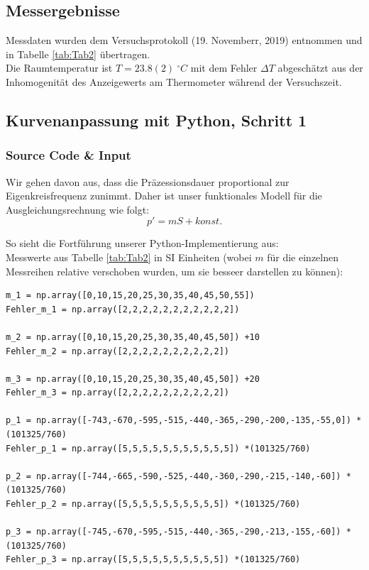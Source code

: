 \documentclass[a4paper,10pt]{article}
\begin{document}
\subsection{Messergebnisse}
Messdaten wurden dem Versuchsprotokoll (19. Novemberr, 2019) entnommen und in Tabelle \ref{tab:Tab2} übertragen.\\
Die Raumtemperatur ist \(T=23.8(2)\:^{\circ}C\) mit dem Fehler \(\Delta T\) abgeschätzt aus der Inhomogenität des Anzeigewerts am Thermometer während der Versuchszeit.
\subsection{Kurvenanpassung mit Python, Schritt 1}
\subsubsection{Source Code \& Input}
Wir gehen davon aus, dass die Präzessionsdauer proportional zur Eigenkreisfrequenz zunimmt.
Daher ist unser funktionales Modell für die Ausgleichungsrechnung wie folgt:
\begin{equation} \label{eq:Fit2}
	\boxed{p' = mS + konst.}
\end{equation} 

So sieht die Fortführung unserer Python-Implementierung aus:\\

Messwerte aus Tabelle \ref{tab:Tab2} in SI Einheiten (wobei \(m\) für die einzelnen Messreihen relative verschoben wurden, um sie besseer darstellen zu können):
\begin{lstlisting}
m_1 = np.array([0,10,15,20,25,30,35,40,45,50,55]) 
Fehler_m_1 = np.array([2,2,2,2,2,2,2,2,2,2,2])

m_2 = np.array([0,10,15,20,25,30,35,40,45,50]) +10 
Fehler_m_2 = np.array([2,2,2,2,2,2,2,2,2,2])

m_3 = np.array([0,10,15,20,25,30,35,40,45,50]) +20 
Fehler_m_3 = np.array([2,2,2,2,2,2,2,2,2,2])

p_1 = np.array([-743,-670,-595,-515,-440,-365,-290,-200,-135,-55,0]) *(101325/760)
Fehler_p_1 = np.array([5,5,5,5,5,5,5,5,5,5,5]) *(101325/760)

p_2 = np.array([-744,-665,-590,-525,-440,-360,-290,-215,-140,-60]) *(101325/760)
Fehler_p_2 = np.array([5,5,5,5,5,5,5,5,5,5]) *(101325/760)

p_3 = np.array([-745,-670,-595,-515,-440,-365,-290,-213,-155,-60]) *(101325/760)
Fehler_p_3 = np.array([5,5,5,5,5,5,5,5,5,5]) *(101325/760)
\end{lstlisting}
\end{document}
